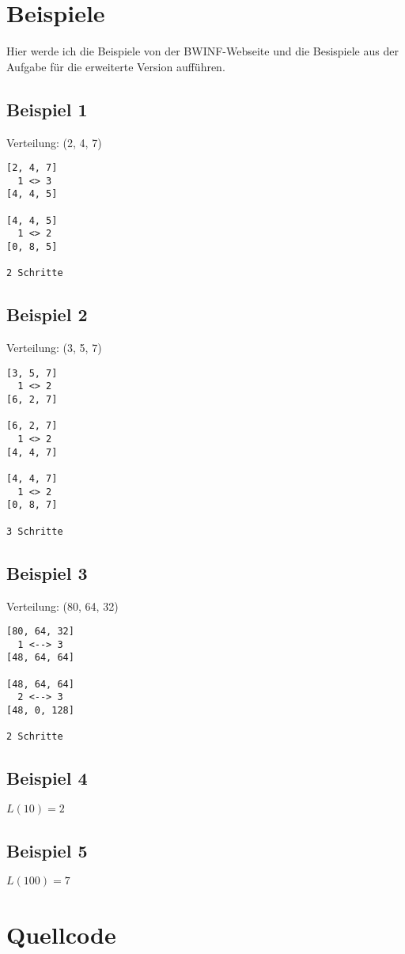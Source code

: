 \documentclass[a4paper,10pt]{scrartcl}
\begin{document}
\section{Beispiele}
Hier werde ich die Beispiele von der BWINF-Webseite und die Besispiele aus der Aufgabe für die erweiterte Version aufführen.

\subsection{Beispiel 1}
Verteilung: (2, 4, 7)
\begin{lstlisting}
[2, 4, 7]
  1 <> 3
[4, 4, 5]

[4, 4, 5]
  1 <> 2
[0, 8, 5]

2 Schritte
\end{lstlisting}

\subsection{Beispiel 2}
Verteilung: (3, 5, 7)
\begin{lstlisting}
[3, 5, 7]
  1 <> 2
[6, 2, 7]

[6, 2, 7]
  1 <> 2
[4, 4, 7]

[4, 4, 7]
  1 <> 2
[0, 8, 7]

3 Schritte
\end{lstlisting}

\subsection{Beispiel 3}
Verteilung: (80, 64, 32)
\begin{lstlisting}
[80, 64, 32]
  1 <--> 3
[48, 64, 64]

[48, 64, 64]
  2 <--> 3
[48, 0, 128]

2 Schritte
\end{lstlisting}

\subsection{Beispiel 4}
\(L(10)=2\)

\subsection{Beispiel 5}
\(L(100)=7\)

\section{Quellcode}
\lstset{numbers=left}

\end{document}
